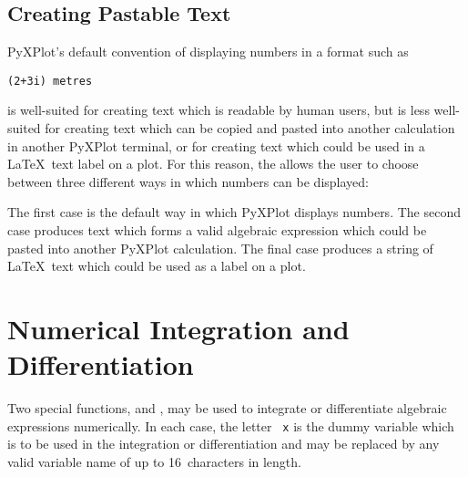 \subsection{Creating Pastable Text}
\label{sec:pastable}

PyXPlot's default convention of displaying numbers in a format such as

\begin{verbatim}
(2+3i) metres
\end{verbatim}

\noindent is well-suited for creating text which is readable by human users, but
is less well-suited for creating text which can be copied and pasted into
another calculation in another PyXPlot terminal, or for creating text which
could be used in a \LaTeX\ text label on a plot. For this reason, the
 allows the user to choose between three
different ways in which numbers can be displayed:

\vspace{3mm}
\newline
{}\newline
{}\newline
{}\newline
{}\newline
{}\newline
{}\newline
{}\newline
{}
\vspace{3mm}

The first case is the default way in which PyXPlot displays numbers. The second
case produces text which forms a valid algebraic expression which could be
pasted into another PyXPlot calculation. The final case produces a string of
\LaTeX\ text which could be used as a label on a plot.

\section{Numerical Integration and Differentiation}

 Two special functions,
 and , may be used to integrate or
differentiate algebraic expressions numerically.  In each case, the letter {\tt
x} is the dummy variable which is to be used in the integration or
differentiation and may be replaced by any valid variable name of up to
16~characters in length.

